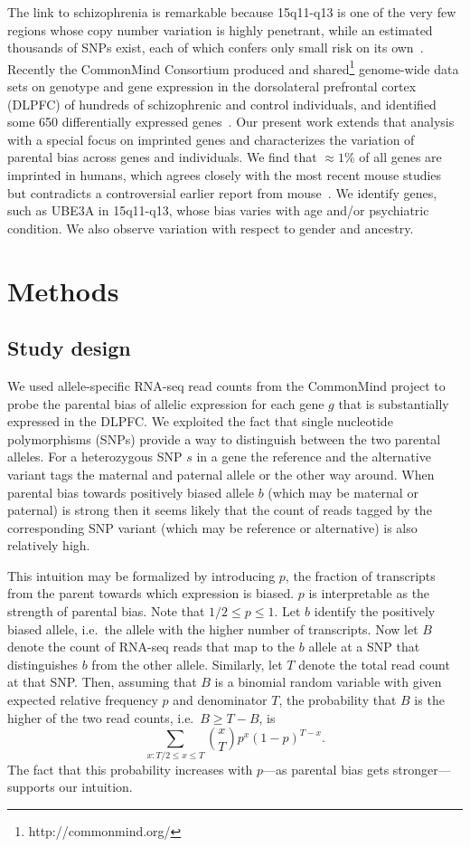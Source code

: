 \documentclass[letterpaper]{article}
\begin{document}
The link to schizophrenia is remarkable because 15q11-q13 is one of the very
few regions whose copy number variation is highly penetrant, while an
estimated thousands of SNPs exist, each of which confers only small risk
on its own~\cite{Sullivan2012}.  Recently the CommonMind Consortium produced
and shared\footnote{http://commonmind.org/} genome-wide data sets on genotype
and gene
expression in the dorsolateral prefrontal cortex (DLPFC) of hundreds of
schizophrenic and control individuals, and identified some 650 differentially
expressed genes~\cite{Fromer2016a}.  Our present work extends that analysis
with a special focus on imprinted genes and characterizes the variation of
parental bias across genes and individuals.  We find that \(\approx
1\%\) of all genes are imprinted in humans, which agrees closely with the most
recent mouse studies~\cite{Perez2015,DeVeale2012} but contradicts a
controversial earlier
report from mouse~\cite{Gregg2010a}.  We identify genes, such as UBE3A in 15q11-q13,
whose bias varies with age and/or psychiatric condition.  We also observe
variation with respect to gender and ancestry.

\section{Methods}

\subsection{Study design}

We used allele-specific RNA-seq read counts from the CommonMind project to
probe the parental bias of allelic expression for each gene \(g\) that is
substantially expressed in the DLPFC.  We exploited the fact that single
nucleotide polymorphisms (SNPs) provide a way to distinguish between the two
parental alleles.  For a heterozygous SNP \(s\) in a gene the reference and the
alternative variant tags the maternal and paternal allele or the other way
around.  When parental bias towards positively biased allele \(b\) (which may
be maternal or paternal) is strong then it seems likely that the count of
reads tagged by the corresponding SNP variant (which may be reference or
alternative) is also relatively high.

This intuition may be formalized by introducing \(p\), the fraction of
transcripts from the parent towards which expression is biased.  \(p\) is
interpretable as the strength of parental bias.  Note that \(1/2\le p\le 1\).  Let \(b\)
identify the positively biased allele, i.e.~the allele with the higher number of
transcripts.  Now let \(B\) denote the count of RNA-seq
reads that map to the \(b\) allele at a SNP that distinguishes \(b\) from the
other allele.  Similarly, let \(T\) denote the total read count at that SNP.
Then, assuming that \(B\) is a binomial random variable with given expected
relative frequency \(p\) and denominator \(T\), the probability that \(B\) is
the higher of the two read counts, i.e.~\(B \ge T - B\), is \[\sum_{x:T/2\le
x\le T} {x \choose T} p^x (1 - p)^{T-x}.\] The fact that this probability
increases with \(p\)---as parental bias gets stronger---supports our intuition.
\end{document}
